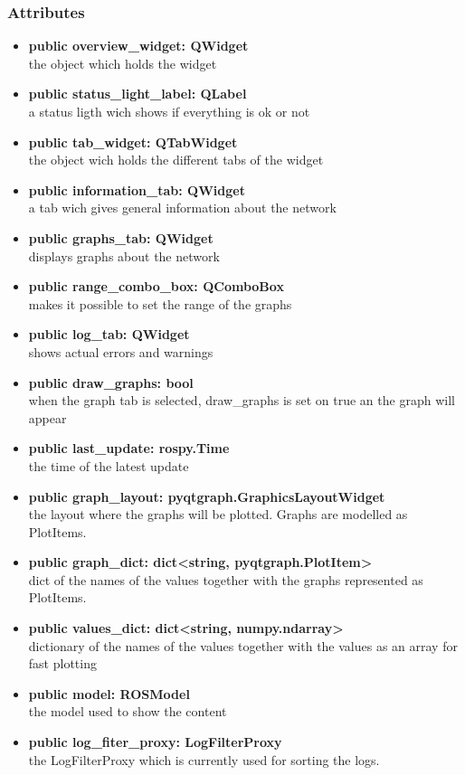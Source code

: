 \subsubsection{Attributes}
\begin{itemize}
  \item \textbf{public overview\_widget: QWidget}\\
  the object which holds the widget
  \item \textbf{public status\_light\_label: QLabel}\\
  a status ligth wich shows if everything is ok or not
  \item \textbf{public tab\_widget: QTabWidget}\\
  the object wich holds the different tabs of the widget
  \item \textbf{public information\_tab: QWidget}\\
  a tab wich gives general information about the network 
  \item \textbf{public graphs\_tab: QWidget}\\
  displays graphs about the network
  \item \textbf{public range\_combo\_box: QComboBox}\\
  makes it possible to set the range of the graphs
  \item \textbf{public log\_tab: QWidget}\\
  shows actual errors and warnings
  \item \textbf{public draw\_graphs: bool}\\
  when the graph tab is selected, draw\_graphs is set on true an the graph will
  appear
  \item \textbf{public last\_update: rospy.Time}\\
  the time of the latest update
  \item \textbf{public graph\_layout: pyqtgraph.GraphicsLayoutWidget}\\
  the layout where the graphs will be plotted. Graphs are modelled as PlotItems.
  \item \textbf{public graph\_dict: dict<string, pyqtgraph.PlotItem>}\\
  dict of the names of the values together with the graphs represented as PlotItems.
  \item \textbf{public values\_dict: dict<string, numpy.ndarray>}\\
  dictionary of the names of the values together with the values as an array for fast plotting
  \item \textbf{public model: ROSModel}\\
  the model used to show the content
  \item \textbf{public log\_fiter\_proxy: LogFilterProxy}\\
  the LogFilterProxy which is currently used for sorting the logs.
  
\end{itemize}

